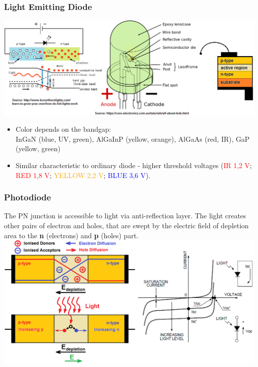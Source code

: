 \documentclass{beamer}
\begin{document}
	\begin{frame}
    \frametitle{Light Emitting Diode}
			\includegraphics[scale=0.35]{obr11_LED.png}
		\small
		\begin{itemize}
			\item Color depends on the bandgap: \\InGaN (blue, UV, green), AlGaInP (yellow, orange), AlGaAs (red, IR), GaP (yellow, green)
			\item Similar characteristic to ordinary diode - higher threshold voltages (\textcolor{red}{IR 1,2 V}; \textcolor{red}{RED 1,8 V}; \textcolor{orange}{YELLOW 2,2 V}; \textcolor{blue}{BLUE 3,6 V}).
		\end{itemize}
	\end{frame}
	\begin{frame}
    \frametitle{Photodiode}
		The PN junction is accessible to light via anti-reflection layer. The light creates other pairs of electron and holes, that are swept by the electric field of depletion area to the \textbf{n} (electrons) and \textbf{p} (holes) part.
		\includegraphics[scale=0.25]{obr02_char.png}
	\end{frame}
\end{document}
